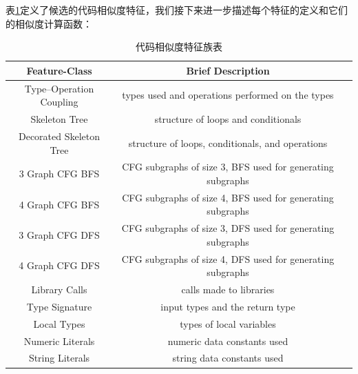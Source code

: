 表\ref{table:search-similarity}定义了候选的代码相似度特征，我们接下来进一步描述每个特征的定义和它们的相似度计算函数：


\begin{table}[h]
\centering
\begin{threeparttable}[b]
\caption{代码相似度特征族表}
\label{table:search-similarity}
\begin{tabular}{ccc} \toprule
    {Feature-Class} & {Brief Description} \\ \midrule
Type–Operation Coupling & types used and operations performed on the types \\
Skeleton Tree & structure of loops and conditionals \\
Decorated Skeleton Tree & structure of loops, conditionals, and operations \\
3 Graph CFG BFS & CFG subgraphs of size 3, BFS used for generating subgraphs \\
4 Graph CFG BFS & CFG subgraphs of size 4, BFS used for generating subgraphs \\
3 Graph CFG DFS & CFG subgraphs of size 3, DFS used for generating subgraphs \\
4 Graph CFG DFS & CFG subgraphs of size 4, DFS used for generating subgraphs \\
Library Calls & calls made to libraries \\
Type Signature & input types and the return type \\
Local Types & types of local variables \\
Numeric Literals & numeric data constants used \\
String Literals & string data constants used \\
\bottomrule                                                   
\end{tabular}
\end{threeparttable}
\end{table}


